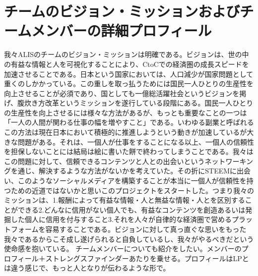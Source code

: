 \documentclass{jsarticle}
\begin{document}
\section{チームのビジョン・ミッションおよびチームメンバーの詳細プロフィール}
我々ALISのチームのビジョン・ミッションは明確である。ビジョンは、世の中の有益な情報と人を可視化することにより、CtoCでの経済圏の成長スピードを加速させることである。日本という国家においては、人口減少が国家問題として重くのしかかっている。この重しを取っ払うためには国民一人ひとりの生産性を向上させることが必須であり、国としても一億総活躍社会というビジョンを掲げ、腹炊き方改革というミッションを遂行している段階にある。国民一人ひとりの生産性を向上させるには様々な方法があるが、もっとも重要なことの一つは「一人の人間が関わる仕事の幅を増やすこと」である。いわゆる副業と呼ばれるこの方法は現在日本において積極的に推進しようという動きが加速しているが大きな問題がある。それは、一個人が仕事をすることになる以上、一個人の信頼性を担保しないことには結局は絵に書いた餅で終わってしまうことである。我々はこの問題に対して、信頼できるコンテンツと人との出会いというネットワーキングを通じ、解決するような方法がないかを考えていた。その折にSTEEMに出会い、このようなソーシャルメディアを構築することが本当に一個人が信頼性を持つための近道ではないかと思いこのプロジェクトをスタートした。つまり我々のミッションは、1.報酬によって有益な情報・人と無益な情報・人とを区別することができる2.どんなに信用がない個人でも、有益なコンテンツを創造あるいは発掘した個人に信用を付与すること3.それを人々が自律的な経済圏で営めるプラットフォームを容易することである。ビジョンに対して真っ直ぐな思いをもった我々であるからこそ成し遂げられると自負しているし、我々がやるべきだという使命感を抱いている。
チームメンバーについても紹介をしたい。メンバーのプロフィール＋ストレングスファインダーあたりを乗せる。プロフィールはLPとは違う感じで、もっと人となりが伝わるような形で。
\end{document}

